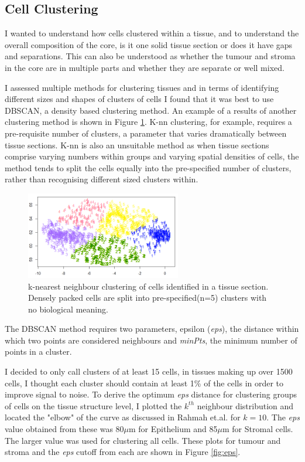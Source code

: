 \subsection{Cell Clustering}

I wanted to understand how cells clustered within a tissue, and to understand the overall composition of the core, is it one solid tissue section or does it have gaps and separations. This can also be understood as whether the tumour and stroma in the core are in multiple parts and whether they are separate or well mixed.

I assessed multiple methods for clustering tissues and in terms of identifying different sizes and shapes of clusters of cells I found that it was best to use DBSCAN, a density based clustering method. An example of a results of another clustering method is shown in Figure \ref{fig:clust_bad}. K-nn clustering, for example, requires a pre-requisite number of clusters, a parameter that varies dramatically between tissue sections. K-nn is also an unsuitable method as when tissue sections comprise varying numbers within groups and varying spatial densities of cells, the method tends to split the cells equally into the pre-specified number of clusters, rather than recognising different sized clusters within.

\begin{figure}
    \centering
    \includegraphics{Chapter3/Figs/knn_example_2.png}
    \caption[k-nearest neighbour clustering of cells]{k-nearest neighbour clustering of cells identified in a tissue section. Densely packed cells are split into pre-specified(n=5) clusters with no biological meaning.}
    \label{fig:clust_bad}
\end{figure}


The DBSCAN method requires two parameters, epsilon (\textit{eps}), the distance within which two points are considered neighbours and \textit{minPts}, the minimum number of points in a cluster.

I decided to only call clusters of at least 15 cells, in tissues making up over 1500 cells, I thought each cluster should contain at least 1\% of the cells in order to improve signal to noise. To derive the optimum \textit{eps} distance for clustering groups of cells on the tissue structure level, I plotted the $k^{th}$ neighbour distribution and located the "elbow" of the curve as discussed in Rahmah et.al. for $k=10$\cite{rahmah2016determination}. The \textit{eps} value obtained from these was 80$\mu$m for Epithelium and 85$\mu$m for Stromal cells. The larger value was used for clustering all cells. These plots for tumour and stroma and the \textit{eps} cutoff from each are shown in Figure \ref{fig:eps}.

